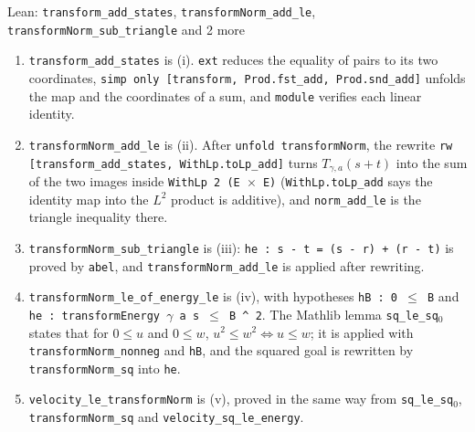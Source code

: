 \documentclass[11pt,a4paper]{article}
\begin{document}
\begin{leanbox}{Lean: \texttt{transform\_\allowbreak{}add\_\allowbreak{}states}, \texttt{transformNorm\_\allowbreak{}add\_\allowbreak{}le}, \texttt{transformNorm\_\allowbreak{}sub\_\allowbreak{}triangle} and 2 more}
\begin{enumerate}
\item \texttt{transform\_\allowbreak{}add\_\allowbreak{}states} is (i). \texttt{ext} reduces the equality of pairs to its two coordinates, \texttt{simp only [transform, Prod.\allowbreak{}fst\_\allowbreak{}add, Prod.\allowbreak{}snd\_\allowbreak{}add]} unfolds the map and the coordinates of a sum, and \texttt{module} verifies each linear identity.

\item \texttt{transform\allowbreak{}Norm\_\allowbreak{}add\_\allowbreak{}le} is (ii). After \texttt{unfold transform\allowbreak{}Norm}, the rewrite \texttt{rw [transform\_\allowbreak{}add\_\allowbreak{}states, With\allowbreak{}Lp.\allowbreak{}to\allowbreak{}Lp\_\allowbreak{}add]} turns \(T_{\gamma,a}(s+t)\) into the sum of the two images inside \texttt{With\allowbreak{}Lp 2 (E \ensuremath{\times} E)} (\texttt{With\allowbreak{}Lp.\allowbreak{}to\allowbreak{}Lp\_\allowbreak{}add} says the identity map into the \(L^2\) product is additive), and \texttt{norm\_\allowbreak{}add\_\allowbreak{}le} is the triangle inequality there.

\item \texttt{transform\allowbreak{}Norm\_\allowbreak{}sub\_\allowbreak{}triangle} is (iii): \texttt{he : s -\allowbreak{} t = (s -\allowbreak{} r) + (r -\allowbreak{} t)} is proved by \texttt{abel}, and \texttt{transform\allowbreak{}Norm\_\allowbreak{}add\_\allowbreak{}le} is applied after rewriting.

\item \texttt{transform\allowbreak{}Norm\_\allowbreak{}le\_\allowbreak{}of\_\allowbreak{}energy\_\allowbreak{}le} is (iv), with hypotheses \texttt{h\allowbreak{}B : 0 \ensuremath{\le} B} and \texttt{he : transform\allowbreak{}Energy \ensuremath{\gamma} a s \ensuremath{\le} B \textasciicircum{} 2}. The Mathlib lemma \texttt{sq\_\allowbreak{}le\_\allowbreak{}sq\ensuremath{{}_{0}}} states that for \(0\le u\) and \(0\le w\), \(u^2\le w^2\iff u\le w\); it is applied with \texttt{transform\allowbreak{}Norm\_\allowbreak{}nonneg} and \texttt{h\allowbreak{}B}, and the squared goal is rewritten by \texttt{transform\allowbreak{}Norm\_\allowbreak{}sq} into \texttt{he}.

\item \texttt{velocity\_\allowbreak{}le\_\allowbreak{}transform\allowbreak{}Norm} is (v), proved in the same way from \texttt{sq\_\allowbreak{}le\_\allowbreak{}sq\ensuremath{{}_{0}}}, \texttt{transform\allowbreak{}Norm\_\allowbreak{}sq} and \texttt{velocity\_\allowbreak{}sq\_\allowbreak{}le\_\allowbreak{}energy}.

\end{enumerate}
\end{leanbox}
\end{document}
